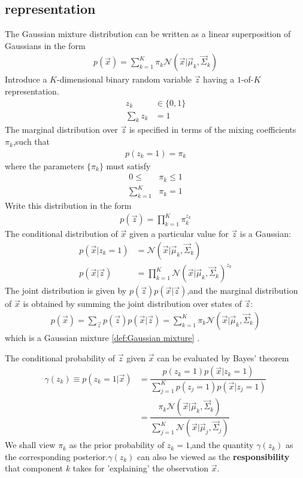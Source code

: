 \subsection{representation}
The Gaussian mixture distribution can be written as a linear superposition of Gaussians in the form
\begin{align}\label{def:Gaussian mixture}
p(\vec{x}) =
\sum_{k=1}^{K}\pi_k\mathcal{N}(\vec{x}|\vec{\mu}_k,\vec{\Sigma}_k)
\end{align}
Introduce a $K$-dimensional binary random variable $\vec{z}$ having a $1$-of-$K$ representation.
\begin{align}
z_k &\in \{ 0,1\} \\
\sum_k z_k &=1
\end{align}
The marginal distribution over $\vec{z}$ is specified in terms of the mixing coefficients $\pi_k$,such that
\begin{align}
p(z_k=1) = \pi_k
\end{align}
where the parameters $\{ \pi_k\}$ must satisfy
\begin{align}
0 \leq &\pi_k \leq 1\\
\sum_{k=1}^{K} &\pi_k = 1
\end{align}
Write this distribution in the form
\begin{align}
p(\vec{z}) = \prod_{k=1}^{K}\pi_k^{z_k}
\end{align}
The conditional distribution of $\vec{x}$ given a particular value for $\vec{z}$ is a Gaussian:
\begin{align}
p(\vec{x}|z_k=1) &= \mathcal{N}(\vec{x}|\vec{\mu}_k,\vec{\Sigma}_k) \\
p(\vec{x}|\vec{z}) 
&=\prod_{k=1}^{K}\mathcal{N}(\vec{x}|\vec{\mu}_k,\vec{\Sigma}_k)^{z_k}
\end{align}
The joint distribution is given by $p(\vec{z})p(\vec{x}|\vec{z})$,and the marginal distribution of $\vec{x}$ is obtained by summing the joint distribution over states of $\vec{z}$:
\begin{align}
p(\vec{x}) = \sum_{\vec{z}}{p(\vec{z})p(\vec{x}|\vec{z})} =
\sum_{k=1}^{K}\pi_k\mathcal{N}(\vec{x}|\vec{\mu}_k,\vec{\Sigma}_k)
\end{align}
which is a Gaussian mixture \ref{def:Gaussian mixture} .

The conditional probability of $\vec{z}$ given $\vec{x}$ can be evaluated by Bayes' theorem
\begin{align}
\gamma(z_k)\equiv p(z_k=1|\vec{x}) 
&=\dfrac{p(z_k=1)p(\vec{x}|z_k=1)} {\sum_{j=1}^{K}p(z_j=1)p(\vec{x}|z_j=1)} \\
&=\dfrac{\pi_k \mathcal{N}(\vec{x}|\vec{\mu}_k,\vec{\Sigma}_k)}  
	{\sum_{j=1}^{K}\mathcal{N}(\vec{x}|\vec{\mu}_j,\vec{\Sigma}_j)}
\end{align}
We shall view $\pi_k$ as the prior probability of $z_k=1$,and the quantity $\gamma(z_k)$ as the corresponding posterior.$\gamma(z_k)$ can also be viewed as the \textbf{responsibility} that component $k$ takes for 'explaining' the observation $\vec{x}$.

